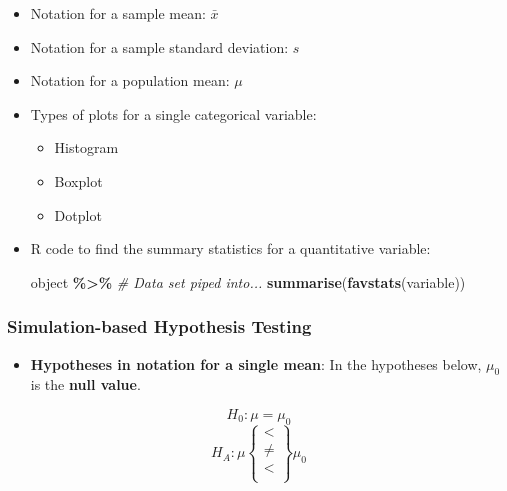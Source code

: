 \documentclass[
]{report}
\newenvironment{Shaded}{\begin{snugshade}}{\end{snugshade}}
\newcommand{\CommentTok}[1]{\textcolor[rgb]{0.56,0.35,0.01}{\textit{#1}}}
\newcommand{\FunctionTok}[1]{\textcolor[rgb]{0.13,0.29,0.53}{\textbf{#1}}}
\newcommand{\NormalTok}[1]{#1}
\newcommand{\SpecialCharTok}[1]{\textcolor[rgb]{0.81,0.36,0.00}{\textbf{#1}}}
\providecommand{\tightlist}{%
  \setlength{\itemsep}{0pt}\setlength{\parskip}{0pt}}
\begin{document}
\begin{itemize}
\item
  Notation for a sample mean: \(\bar{x}\)
\item
  Notation for a sample standard deviation: \(s\)
\item
  Notation for a population mean: \(\mu\)
\item
  Types of plots for a single categorical variable:

  \begin{itemize}
  \item
    Histogram
  \item
    Boxplot
  \item
    Dotplot
  \end{itemize}
\item
  R code to find the summary statistics for a quantitative variable:

\begin{Shaded}
\begin{Highlighting}[]
\NormalTok{object }\SpecialCharTok{\%\textgreater{}\%} \CommentTok{\# Data set piped into...}
    \FunctionTok{summarise}\NormalTok{(}\FunctionTok{favstats}\NormalTok{(variable))}
\end{Highlighting}
\end{Shaded}
\end{itemize}

\subsubsection*{Simulation-based Hypothesis Testing}\label{simulation-based-hypothesis-testing}

\begin{itemize}
\tightlist
\item
  \textbf{Hypotheses in notation for a single mean}: In the hypotheses below, \(\mu_0\) is the \textbf{null value}.
\end{itemize}

\[H_0: \mu = \mu_0\]
\[H_A: \mu\left\{
\begin{array}{ll}
< \\
\ne \\
< \\
\end{array}
\right\}
\mu_0 \]
\end{document}
